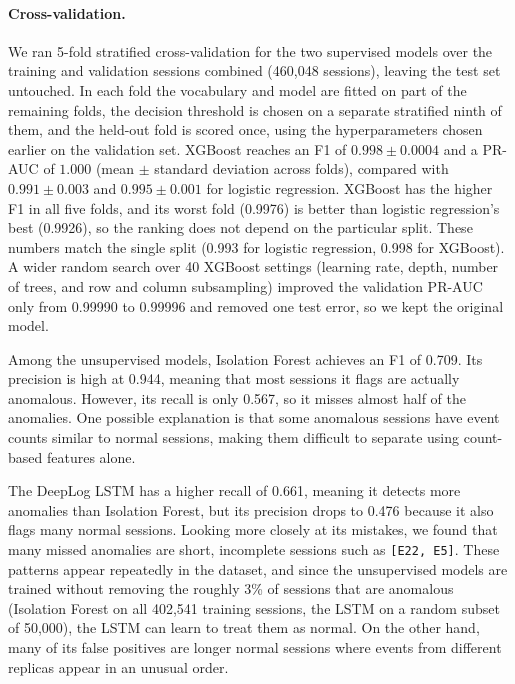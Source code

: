 \documentclass[11pt]{article}
\begin{document}
\paragraph{Cross-validation.} We ran 5-fold stratified cross-validation for the two supervised models over the training and validation sessions combined (460,048 sessions), leaving the test set untouched. In each fold the vocabulary and model are fitted on part of the remaining folds, the decision threshold is chosen on a separate stratified ninth of them, and the held-out fold is scored once, using the hyperparameters chosen earlier on the validation set. XGBoost reaches an F1 of $0.998 \pm 0.0004$ and a PR-AUC of $1.000$ (mean $\pm$ standard deviation across folds), compared with $0.991 \pm 0.003$ and $0.995 \pm 0.001$ for logistic regression. XGBoost has the higher F1 in all five folds, and its worst fold (0.9976) is better than logistic regression's best (0.9926), so the ranking does not depend on the particular split. These numbers match the single split (0.993 for logistic regression, 0.998 for XGBoost). A wider random search over 40 XGBoost settings (learning rate, depth, number of trees, and row and column subsampling) improved the validation PR-AUC only from 0.99990 to 0.99996 and removed one test error, so we kept the original model.

Among the unsupervised models, Isolation Forest achieves an F1 of 0.709. Its precision is high at 0.944, meaning that most sessions it flags are actually anomalous. However, its recall is only 0.567, so it misses almost half of the anomalies. One possible explanation is that some anomalous sessions have event counts similar to normal sessions, making them difficult to separate using count-based features alone.

The DeepLog LSTM has a higher recall of 0.661, meaning it detects more anomalies than Isolation Forest, but its precision drops to 0.476 because it also flags many normal sessions. Looking more closely at its mistakes, we found that many missed anomalies are short, incomplete sessions such as \texttt{[E22, E5]}. These patterns appear repeatedly in the dataset, and since the unsupervised models are trained without removing the roughly 3\% of sessions that are anomalous (Isolation Forest on all 402,541 training sessions, the LSTM on a random subset of 50,000), the LSTM can learn to treat them as normal. On the other hand, many of its false positives are longer normal sessions where events from different replicas appear in an unusual order.
\end{document}
